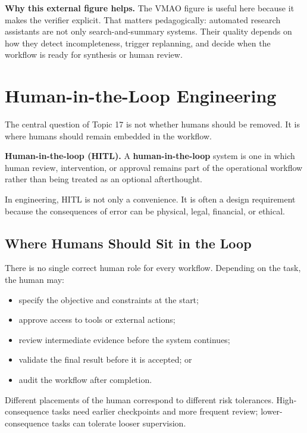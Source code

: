 \documentclass[12pt]{article}
\begin{document}
\begin{ex-box}
\textbf{Why this external figure helps.} The VMAO figure is useful here because it makes the verifier explicit. That matters pedagogically: automated research assistants are not only search-and-summary systems. Their quality depends on how they detect incompleteness, trigger replanning, and decide when the workflow is ready for synthesis or human review.
\end{ex-box}

\section{Human-in-the-Loop Engineering}

The central question of Topic 17 is not whether humans should be removed. It is where humans should remain embedded in the workflow.

\begin{def-box}
\textbf{Human-in-the-loop (HITL).} A \textbf{human-in-the-loop} system is one in which human review, intervention, or approval remains part of the operational workflow rather than being treated as an optional afterthought.
\end{def-box}

In engineering, HITL is not only a convenience. It is often a design requirement because the consequences of error can be physical, legal, financial, or ethical.

\subsection{Where Humans Should Sit in the Loop}

There is no single correct human role for every workflow. Depending on the task, the human may:
\begin{itemize}
    \item specify the objective and constraints at the start;
    \item approve access to tools or external actions;
    \item review intermediate evidence before the system continues;
    \item validate the final result before it is accepted; or
    \item audit the workflow after completion.
\end{itemize}

Different placements of the human correspond to different risk tolerances. High-consequence tasks need earlier checkpoints and more frequent review; lower-consequence tasks can tolerate looser supervision.
\end{document}
